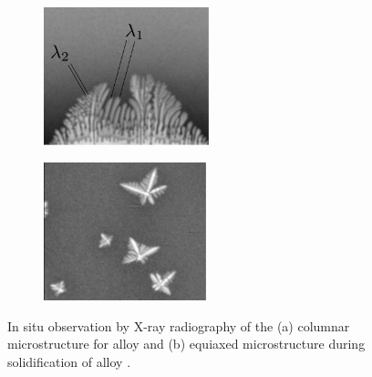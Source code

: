 \begin{figure}[htbp]
\centering
  \begin{subfigure}[t]{0.45\textwidth}
    \centering
	\includegraphics[height=4cm]{Chapter0/Graphics/dendrite_C.pdf}
	\caption{}
    \label{fig:dendrite_C}
  \end{subfigure}
   \begin{subfigure}[t]{0.45\textwidth}
    \centering
	\includegraphics[height=4cm]{Chapter0/Graphics/dendrite_E.pdf}
	\caption{}
    \label{fig:dendrite_E}
  \end{subfigure}
\caption{In situ observation by X-ray radiography of the (a) columnar microstructure for  alloy \citep{buffet_measurement_2010}
and (b) equiaxed microstructure during solidification of  alloy \citep{bogno_growth_2013}.}
\label{fig:casting}
\end{figure}
%
%
